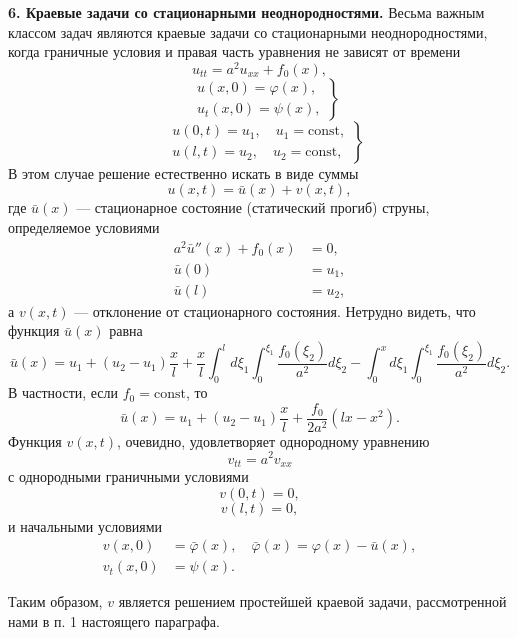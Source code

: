 \documentclass[a4paper,10pt]{article}
\begin{document}
\fancyhead[L]{\thepage}                                      %
\thispagestyle{fancy}
\setcounter{page}{104}
\textbf{6. Краевые задачи со стационарными неоднородностями.} Весьма важным классом задач являются краевые задачи со стационарными неоднородностями, когда граничные условия и правая часть уравнения не зависят от времени
\[
u_{tt} = a^2 u_{xx} + f_0(x), \tag{45'}
\]
\[
\left.
\begin{aligned}
&u(x, 0) = \varphi(x), \\
&u_t(x, 0) = \psi(x),
\end{aligned}
\right\}
\tag{46}
\]
\[
\left.
\begin{aligned}
&u(0, t) = u_1, \quad u_1 = \text{const}, \\
&u(l, t) = u_2, \quad u_2 = \text{const},
\end{aligned}
\right\}
\tag{47'}
\]
В этом случае решение естественно искать в виде суммы
\[
u(x, t) = \bar{u}(x) + v(x, t),
\]
где \(\bar{u}(x)\) — стационарное состояние (статический прогиб) струны, определяемое условиями
\[
\begin{aligned}
a^2 \bar{u}''(x) + f_0(x) &= 0, \\
\bar{u}(0) &= u_1, \\
\bar{u}(l) &= u_2,
\end{aligned}
\]
а \(v(x, t)\) — отклонение от стационарного состояния. Нетрудно видеть, что функция \(\bar{u}(x)\) равна
\[
\bar{u}(x) = u_1 + (u_2 - u_1) \frac{x}{l} + \frac{x}{l} \int_0^l d\xi_1 \int_0^{\xi_1} \frac{f_0(\xi_2)}{a^2} d\xi_2 - \int_0^x d\xi_1 \int_0^{\xi_1} \frac{f_0(\xi_2)}{a^2} d\xi_2.
\]
В частности, если \(f_0 = \text{const}\), то
\[
\bar{u}(x) = u_1 + (u_2 - u_1) \frac{x}{l} + \frac{f_0}{2a^2} (l x - x^2).
\]
Функция \(v(x, t)\), очевидно, удовлетворяет однородному уравнению
\[
v_{tt} = a^2 v_{xx}
\]
с однородными граничными условиями
\[
v(0, t) = 0,
\]
\[
v(l, t) = 0,
\]
и начальными условиями
\[
\begin{aligned}
v(x, 0) &= \bar{\varphi}(x), \quad \bar{\varphi}(x) = \varphi(x) - \bar{u}(x), \\
v_t(x, 0) &= \psi(x).
\end{aligned}
\]

Таким образом, \(v\) является решением простейшей краевой задачи, рассмотренной нами в п. 1 настоящего параграфа.
\end{document}
